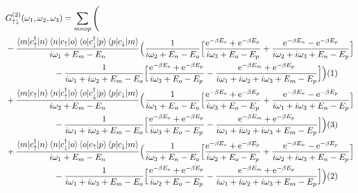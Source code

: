 \documentclass[12pt,a4paper]{scrartcl}
\numberwithin{equation}{section}
\renewcommand{\exp}[1]{\mathrm{e}^{#1}}
\begin{document}
\begin{align}
& G^{(2)}_{\uparrow \downarrow}(\omega_1,\omega_2,\omega_3)
=  \sum_{mnop} \Bigg( \nonumber \\
    & -
 \frac{\braket{m|c^{\dagger}_{\uparrow}|n}\braket{n| c_{\uparrow}|o}\braket{o| c^{\dagger}_{\downarrow} |p}\braket{p| c_{\downarrow} |m}}{i\omega_1 +E_m-E_n}
 \Big( \frac{1}{i\omega_2 +E_n-E_o}
 \Big[
 \frac{\exp{-\beta E_o}+\exp{-\beta E_p} }{i\omega_3 +E_o-E_p} 
  + \frac{ \exp{-\beta E_n} - \exp{-\beta E_p} }{ i\omega_2 + i\omega_3 + E_n- E_p } 
 \Big] \nonumber \\
 & \hspace*{2cm} -  \frac{1}{i\omega_1+ i\omega_2 + E_m-E_o}
 \Big[
  \frac{\exp{-\beta E_o}+\exp{-\beta E_p} }{i\omega_3 +E_o-E_p} 
 -  \frac{ \exp{-\beta E_m}+\exp{-\beta E_p} }{ i\omega_1 + i\omega_2 + i\omega_3 + E_m- E_p } 
 \Big]
 \Big)  (1) \nonumber\\
     &+
 \frac{\braket{m|c_{\uparrow}|n}\braket{n| c^{\dagger}_{\uparrow} |o}\braket{o|c^{\dagger}_{\downarrow} |p}\braket{p|c_{\downarrow} |m}}{i\omega_2 +E_m-E_n}
 \Big( \frac{1}{i\omega_1 +E_n-E_o}
 \Big[
 \frac{\exp{-\beta E_o}+\exp{-\beta E_p} }{i\omega_3 +E_o-E_p} 
  + \frac{ \exp{-\beta E_n} - \exp{-\beta E_p} }{ i\omega_1 + i\omega_3 + E_n- E_p } 
 \Big] \nonumber \\
 & \hspace*{2cm} -  \frac{1}{i\omega_1+ i\omega_2 + E_m-E_o}
 \Big[
  \frac{\exp{-\beta E_o}+\exp{-\beta E_p} }{i\omega_3 +E_o-E_p} 
 -  \frac{ \exp{-\beta E_m}+\exp{-\beta E_p} }{ i\omega_1 + i\omega_2 + i\omega_3 + E_m- E_p } 
 \Big]
 \Big) (3) \nonumber\\
    &+ 
 \frac{\braket{m|c^{\dagger}_{\uparrow}|n}\braket{n| c^{\dagger}_{\downarrow} |o}\braket{o|c_{\uparrow} |p}\braket{p|c_{\downarrow} |m}}{i\omega_1 +E_m-E_n}
 \Big( \frac{1}{i\omega_3 +E_n-E_o}
 \Big[
 \frac{\exp{-\beta E_o}+\exp{-\beta E_p} }{i\omega_2 +E_o-E_p} 
  + \frac{ \exp{-\beta E_n} - \exp{-\beta E_p} }{ i\omega_2 + i\omega_3 + E_n- E_p } 
 \Big] \nonumber \\
 & \hspace*{2cm} -  \frac{1}{i\omega_1+ i\omega_3 + E_m-E_o}
 \Big[
  \frac{\exp{-\beta E_o}+\exp{-\beta E_p} }{i\omega_2 +E_o-E_p} 
 -  \frac{ \exp{-\beta E_m}+\exp{-\beta E_p} }{ i\omega_1 + i\omega_2 + i\omega_3 + E_m- E_p } 
 \Big]
 \Big) (2) \nonumber  \\

\end{align}
\end{document}
